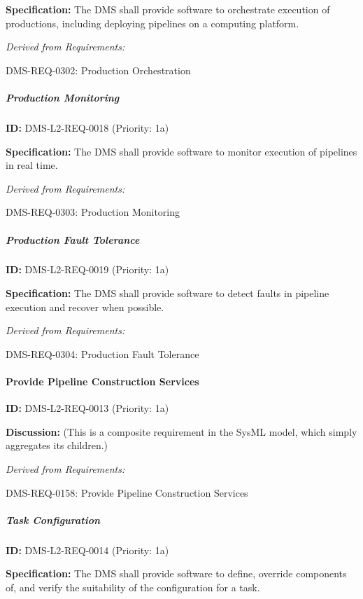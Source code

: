 \documentclass[SE,toc,lsstdraft]{lsstdoc}
\begin{document}
\textbf{Specification:} The DMS shall provide software to orchestrate execution of productions, including deploying pipelines on a computing platform.

\emph{Derived from Requirements:}

DMS-REQ-0302:
Production Orchestration \newline

\subparagraph{Production Monitoring}\hfill  %

\label{DMS-L2-REQ-0018}
\textbf{ID:} DMS-L2-REQ-0018 (Priority: 1a)

\textbf{Specification:} The DMS shall provide software to monitor execution of pipelines in real time.

\emph{Derived from Requirements:}

DMS-REQ-0303:
Production Monitoring \newline

\subparagraph{Production Fault Tolerance}\hfill  %

\label{DMS-L2-REQ-0019}
\textbf{ID:} DMS-L2-REQ-0019 (Priority: 1a)

\textbf{Specification:} The DMS shall provide software to detect faults in pipeline execution and recover when possible.

\emph{Derived from Requirements:}

DMS-REQ-0304:
Production Fault Tolerance \newline

\paragraph{Provide Pipeline Construction Services}\hfill  %

\label{DMS-L2-REQ-0013}
\textbf{ID:} DMS-L2-REQ-0013 (Priority: 1a)

\textbf{Discussion:}
(This is a composite requirement in the SysML model, which simply aggregates its children.)

\emph{Derived from Requirements:}

DMS-REQ-0158:
Provide Pipeline Construction Services \newline

\subparagraph{Task Configuration}\hfill  %

\label{DMS-L2-REQ-0014}
\textbf{ID:} DMS-L2-REQ-0014 (Priority: 1a)

\textbf{Specification:} The DMS shall provide software to define, override components of, and verify the suitability of the configuration for a task.
\end{document}
